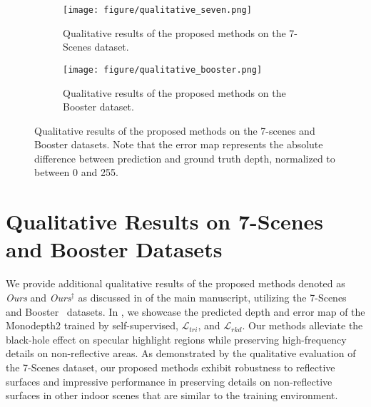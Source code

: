 \begin{figure}[ht]

\begin{subfigure}{\textwidth}
\texttt{[image: figure/qualitative\_seven.png]}
\caption{Qualitative results of the proposed methods on the 7-Scenes dataset.}
\label{fig:qualitative_seven}
\end{subfigure}

\bigskip

\begin{subfigure}{\textwidth}
\texttt{[image: figure/qualitative\_booster.png]}
\caption{Qualitative results of the proposed methods on the Booster dataset.}
\label{fig:qualitative_booster}
\end{subfigure}
\caption{Qualitative results of the proposed methods on the 7-scenes and Booster datasets. Note that the error map represents the absolute difference between prediction and ground truth depth, normalized to between 0 and 255.}
\label{fig:qualitative_supp}
\end{figure}

\section{Qualitative Results on 7-Scenes and Booster Datasets}
We provide additional qualitative results of the proposed methods denoted as \textit{Ours} and \textit{Ours}$^{\dagger}$ as discussed in  of the main manuscript, utilizing the 7-Scenes~\citep{shotton2013scene} and Booster~\citep{ramirez2023booster} datasets.
In , we showcase the predicted depth and error map of the Monodepth2 trained by self-supervised, $\mathcal{L}_{tri}$, and $\mathcal{L}_{rkd}$.
Our methods alleviate the black-hole effect on specular highlight regions while preserving high-frequency details on non-reflective areas. As demonstrated by the qualitative evaluation of the 7-Scenes dataset, our proposed methods exhibit robustness to reflective surfaces and impressive performance in preserving details on non-reflective surfaces in other indoor scenes that are similar to the training environment.

